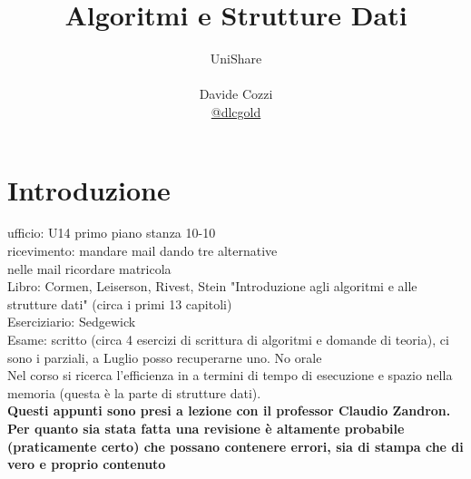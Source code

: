 \documentclass[a4paper,12pt,oneside,tikz]{book}
\title{Algoritmi e Strutture Dati}
\author{UniShare\\\\Davide Cozzi\\\href{https://t.me/dlcgold}{@dlcgold}\\}
\date{}
\begin{document}
\maketitle


\newtheorem{teorema}{Teorema}
\newtheorem{definizione}{Definizione}
\newtheorem{esempio}{Esempio}
\newtheorem{corollario}{Corollario}
\newtheorem{lemma}{Lemma}
\newtheorem{osservazione}{Osservazione}
\newtheorem{nota}{Nota}
\newtheorem{esercizio}{Esercizio}
\tableofcontents
\renewcommand{\chaptermark}[1]{%
\markboth{\chaptername
\ \thechapter.\ #1}{}}
\renewcommand{\sectionmark}[1]{\markright{\thesection.\ #1}}


\chapter{Introduzione}

ufficio: U14 primo piano stanza 10-10\\
ricevimento: mandare mail dando tre alternative\\
nelle mail ricordare matricola\\
Libro: Cormen, Leiserson, Rivest, Stein "Introduzione agli algoritmi e alle strutture dati" (circa i primi 13 capitoli)\\
Eserciziario: Sedgewick\\
Esame: scritto (circa 4 esercizi di scrittura di algoritmi e domande di teoria), ci sono i parziali, a Luglio posso recuperarne uno. No orale \\
Nel corso si ricerca l'efficienza in a termini di tempo di esecuzione e spazio nella memoria (questa è la parte di strutture dati).\\\textbf{Questi appunti sono presi a lezione con il professor Claudio Zandron. Per quanto sia stata fatta una revisione è altamente probabile (praticamente certo) che possano contenere errori, sia di stampa che di vero e proprio contenuto}
\end{document}
